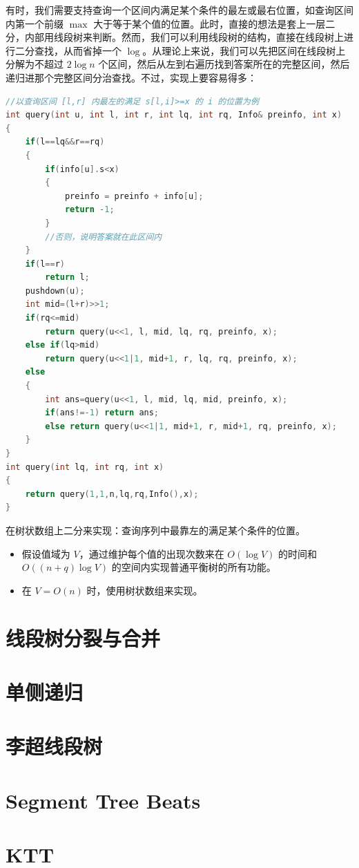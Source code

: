 有时，我们需要支持查询一个区间内满足某个条件的最左或最右位置，如查询区间内第一个前缀 $\max$ 大于等于某个值的位置。此时，直接的想法是套上一层二分，内部用线段树来判断。然而，我们可以利用线段树的结构，直接在线段树上进行二分查找，从而省掉一个 $\log$。从理论上来说，我们可以先把区间在线段树上分解为不超过 $2\log n$ 个区间，然后从左到右遍历找到答案所在的完整区间，然后递归进那个完整区间分治查找。不过，实现上要容易得多：

\begin{lstlisting}[language=C++, caption={线段树上二分}]
//以查询区间 [l,r] 内最左的满足 s[l,i]>=x 的 i 的位置为例
int query(int u, int l, int r, int lq, int rq, Info& preinfo, int x)
{
    if(l==lq&&r==rq)
    {
        if(info[u].s<x)
        {
            preinfo = preinfo + info[u];
            return -1;
        }
        //否则，说明答案就在此区间内
    }
    if(l==r)
        return l;
    pushdown(u);
    int mid=(l+r)>>1;
    if(rq<=mid)
        return query(u<<1, l, mid, lq, rq, preinfo, x);
    else if(lq>mid)
        return query(u<<1|1, mid+1, r, lq, rq, preinfo, x);
    else
    {
        int ans=query(u<<1, l, mid, lq, mid, preinfo, x);
        if(ans!=-1) return ans;
        else return query(u<<1|1, mid+1, r, mid+1, rq, preinfo, x);
    }
}
int query(int lq, int rq, int x)
{
    return query(1,1,n,lq,rq,Info(),x);
}
\end{lstlisting}

\begin{exercise}[树状数组上二分]
    在树状数组上二分来实现：查询序列中最靠左的满足某个条件的位置。
\end{exercise}

\begin{exercise}[权值线段树]
    \begin{itemize}
        \item 假设值域为 $V$，通过维护每个值的出现次数来在 $O(\log V)$ 的时间和 $O((n+q)\log V)$ 的空间内实现普通平衡树的所有功能。
        \item 在 $V=O(n)$ 时，使用树状数组来实现。
    \end{itemize}
\end{exercise}

\section{线段树分裂与合并}

\section{单侧递归}

\section{李超线段树}

\section{Segment Tree Beats}

\section{KTT}

